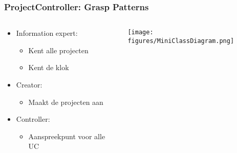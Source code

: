 \documentclass{beamer}
\begin{document}
\begin{frame}
\frametitle {ProjectController: Grasp Patterns}
\begin{columns}
	\begin{column}{.45\paperwidth}
	\begin{itemize}
		\item Information expert:
			\begin{itemize}
				\item Kent alle projecten
				\item Kent de klok
			\end{itemize}
		\item Creator:
			\begin{itemize}
				\item Maakt de projecten aan
			\end{itemize}
		\item Controller:
			\begin{itemize}
				\item Aanspreekpunt voor alle UC
			\end{itemize}
	\end{itemize}
	\end{column}
	\begin{column}{.45\paperwidth}
		\texttt{[image: figures/MiniClassDiagram.png]}
	\end{column}
\end{columns}
\end{frame}
\end{document}
